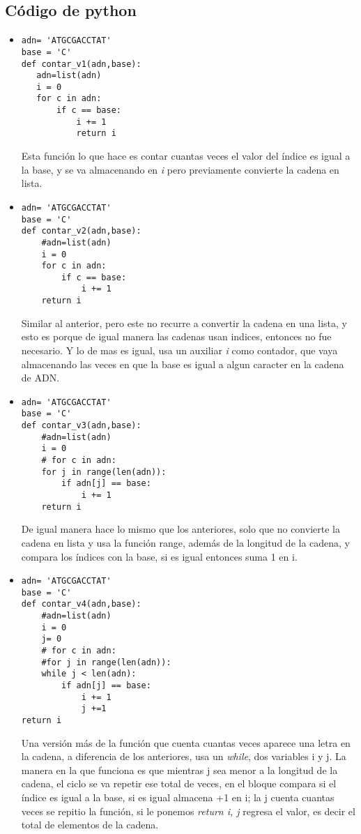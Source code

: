\documentclass{book}
\begin{document}
	\subsection { Código de python}
	\begin{itemize}
		\item \begin{lstlisting}
adn= 'ATGCGACCTAT'
base = 'C'				
def contar_v1(adn,base):
   adn=list(adn)
   i = 0
   for c in adn:
       if c == base:
           i += 1
           return i
		\end{lstlisting} Esta función lo que hace es contar cuantas veces el valor del índice es igual a la base, y se va almacenando en \textit{i} pero previamente convierte la cadena en lista.\\
		
		
		\item \begin{lstlisting}
adn= 'ATGCGACCTAT'
base = 'C'
def contar_v2(adn,base):
    #adn=list(adn)
    i = 0
    for c in adn:
        if c == base:
            i += 1
    return i
		\end{lstlisting} Similar al anterior, pero este no recurre a convertir la cadena en una lista, y esto es porque de igual manera las cadenas usan indices, entonces no fue necesario. Y lo de mas es igual, usa un auxiliar \textit{i} como contador, que vaya almacenando las veces en que la base es igual a algun caracter en la cadena de ADN.\\
		
		\item \begin{lstlisting}
adn= 'ATGCGACCTAT'
base = 'C'
def contar_v3(adn,base):
    #adn=list(adn)
    i = 0
    # for c in adn:
    for j in range(len(adn)):
        if adn[j] == base:
            i += 1
    return i
		\end{lstlisting} De igual manera hace lo mismo que los anteriores, solo que no convierte la cadena en lista y usa la función range, además de la longitud de la cadena, y compara los índices con la base, si es igual entonces suma 1 en i.\\
		
		
		\item \begin{lstlisting}
adn= 'ATGCGACCTAT'
base = 'C'
def contar_v4(adn,base):
    #adn=list(adn)
    i = 0
    j= 0
    # for c in adn:
    #for j in range(len(adn)):
    while j < len(adn):
        if adn[j] == base:
            i += 1
            j +=1
return i
		\end{lstlisting} Una versión más de la función que cuenta cuantas veces aparece una letra en la cadena, a diferencia de los anteriores, usa un \textit{while}, dos variables i y j. La manera en la que funciona es que mientras j sea menor a la longitud de la cadena, el ciclo se va repetir ese total de veces, en el bloque compara si el índice es igual a la base, si es igual almacena +1 en i; la j cuenta cuantas veces se repitio la función, si le ponemos \textit{return i, j} regresa el valor, es decir el total de elementos de la cadena. \\
		

\end{itemize}
\end{document}
